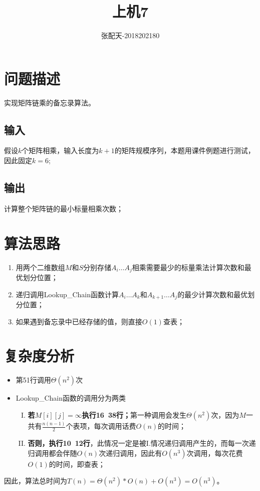 \documentclass{ctexart}[UTF8]
\author{张配天-2018202180}
\title{上机7}
\begin{document}
    \maketitle
    \tableofcontents
    \clearpage
    \section{问题描述}
    实现矩阵链乘的备忘录算法。
    \subsection{输入}
    假设$k$个矩阵相乘，输入长度为$k+1$的矩阵规模序列，本题用课件例题进行测试，因此固定$k=6$;
    \subsection{输出}
    计算整个矩阵链的最小标量相乘次数；
    \section{算法思路}
    \begin{enumerate}
        \item 用两个二维数组$M$和$S$分别存储$A_i \dots A_j$相乘需要最少的标量乘法计算次数和最优划分位置；
        \item 递归调用Lookup\_Chain函数计算$A_i \dots A_k$和$A_{k+1} \dots A_{j}$的最少计算次数和最优划分位置；
        \item 如果遇到备忘录中已经存储的值，则直接$O(1)$查表；
    \end{enumerate}
    \section{复杂度分析}
    \begin{itemize}
        \item 第51行调用$\Theta(n^2)$次
        \item Lookup\_Chain函数的调用分为两类\begin{enumerate}[I.]
        
            \item \textbf{若$M[i][j] = \infty$执行16~38行；}第一种调用会发生$\Theta(n^2)$次，因为$M$一共有$\frac{n(n-1)}{2}$个表项，每次调用话费$O(n)$的时间；
            \item \textbf{否则，执行10~12行}，此情况一定是被I.情况递归调用产生的，而每一次递归调用都会伴随$O(n)$次递归调用，因此有$O(n^3)$次调用，每次花费$O(1)$的时间，即查表；
        \end{enumerate}
    \end{itemize}
    \par 因此，算法总时间为$T(n) = \Theta(n^2)*O(n) + O(n^3) = O(n^3)$。
\end{document}
